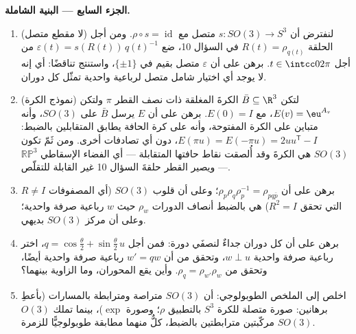 \begin{problem}
\medskip
\noindent\textbf{الجزء السابع --- البنية الشاملة.}
\begin{enumerate}[resume]
  \item (لا مقطع متصل) لنفترض أن $s \colon SO(3) \to
        S^3$ متصل مع $\rho \circ s =
        \operatorname{id}$. ومن
        أجل الحلقة $R(t) =
        \rho_{q(t)}$ في السؤال 10، ضع $\varepsilon(t) =
        s(R(t))\,q(t)^{-1}$ من أجل
        $t \in \intcc0{2\pi}$. برهن على أن $\varepsilon$ متصل بقيم في
        $\{\pm1\}$، واستنتج تناقضًا: أي إنه لا يوجد أي اختيار
        شامل متصل لرباعية واحدية تمثّل كل دوران.
  \item (نموذج الكرة) لتكن $\bar B \subseteq \R^3$ الكرةَ المغلقة ذات نصف
        القطر $\pi$ ولتكن $E(v) = \eu^{A_v}$، مع $E(0) = I$. برهن على أن
        $E$ يرسل $\bar B$ على $SO(3)$، وأنه متباين على الكرة
        المفتوحة، وأنه على كرة الحافة يطابق المتقابلين
        بالضبط: $E(\pi u) = E(-\pi u) = 2uu^{\mathsf T} - I$، دون أي تصادفات أخرى. ومن ثَمّ تكون
        $SO(3)$ هي الكرةَ وقد أُلصقت نقاط حافتها المتقابلة ---
        أي الفضاء الإسقاطي $\mathbb{RP}^3$ --- ويصير القطر
        حلقةَ السؤال 10 غير القابلة للتقلّص.
  \item برهن على أن $\rho_p\rho_q\rho_p^{-1} = \rho_{pq\bar
        p}$؛ وعلى أن قلوب $SO(3)$ (أي المصفوفات
        $R \neq
        I$ التي تحقق $R^2 = I$) هي بالضبط أنصاف الدورات
        $\rho_w$ حيث $w$ رباعية صرفة واحدية؛ وعلى أن مركز
        $SO(3)$ بديهي.
  \item برهن على أن كل دوران جداءٌ لنصفَي دورة: فمن أجل $q = \cos\frac\theta2 +
        \sin\frac\theta2\,u$،
        اختر رباعية صرفة واحدية $w \perp
        u$، وتحقق من أن $w' = qw$
        رباعية صرفة واحدية أيضًا، وتحقق من $\rho_q =
        \rho_{w'}\rho_w$. وأين يقع
        المحوران، وما الزاوية بينهما؟
  \item اخلص إلى الملخص الطوبولوجي: أن $SO(3)$ متراصة ومترابطة
        بالمسارات (بأعطِ برهانين: صورة متصلة للكرة $S^3$
        بالتطبيق $\rho$؛ وصورة $\exp$)، بينما تملك $O(3)$
        مركّبتين مترابطتين بالضبط، كلٌّ منهما مطابقة طوبولوجيًّا
        للزمرة $SO(3)$.


\end{enumerate}
\end{problem}
